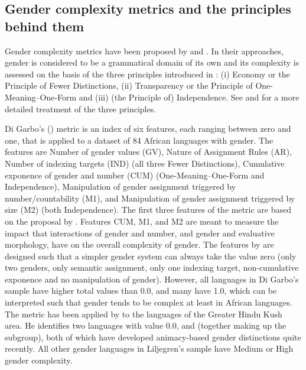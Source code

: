 \documentclass[output=collectionpaper]{langsci/langscibook}
\begin{document}
  \subsection{Gender complexity metrics and the principles behind them}
  \label{sec:WDG:2.2}

Gender complexity metrics have been proposed by \cite{Audring2014,Audring2017} and \cite{DiGarbo2014,DiGarbo2016}. In their approaches, gender is considered to be a grammatical domain of its own and its complexity is assessed on the basis of the three principles introduced in : (i) Economy or the Principle of Fewer Distinctions, (ii) Transparency or the Principle of One-Meaning--One-Form and (iii) (the Principle of) Independence. See  and  for a more detailed treatment of the three principles.

Di Garbo's (\citealt*{DiGarbo2014,DiGarbo2016}) metric is an index of six features, each ranging between zero and one, that is applied to a dataset of 84 African languages with gender. The features are Number of gender values (GV), Nature of Assignment Rules (AR), Number of indexing targets (IND) (all three Fewer Distinctions), Cumulative exponence of gender and number (CUM) (One-Meaning--One-Form and Independence), Manipulation of gender assignment triggered by number/countability (M1), and Manipulation of gender assignment triggered by size (M2) (both Independence). The first three features of the metric are based on the proposal by \cite{Audring2014}. Features CUM, M1, and M2 are meant to measure the impact that interactions of gender and number, and gender and evaluative morphology, have on the overall complexity of gender. The features by \cite{DiGarbo2014,DiGarbo2016} are designed such that a simpler gender system can always take the value zero (only two genders, only semantic assignment, only one indexing target, non-cumulative exponence and no manipulation of gender). However, all languages in Di Garbo's sample have higher total values than 0.0, and many have 1.0, which can be interpreted such that gender tends to be complex at least in African languages. The metric has been applied by  to the languages of the Greater Hindu Kush area. He identifies two languages with value 0.0,  and  (together making up the  subgroup), both of which have developed animacy-based gender distinctions quite recently. All other gender languages in Liljegren's sample have Medium or High gender complexity.
\end{document}
